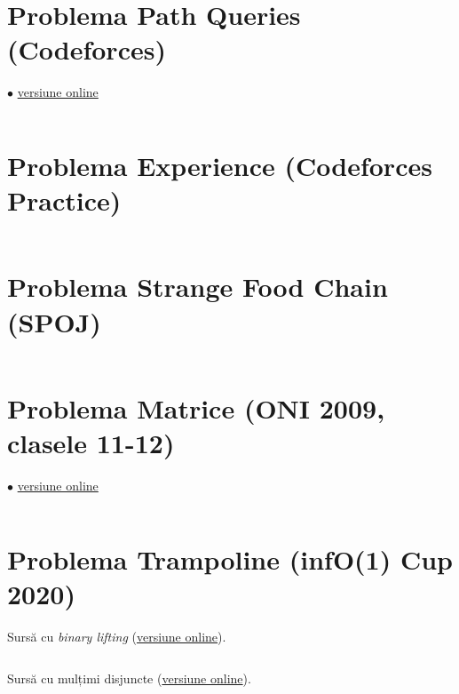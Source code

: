 \documentclass[../main.tex]{subfiles}
\begin{document}
\inputminted{cpp}{../src/other-ds/consecutive-letters.cpp}

\section{Problema Path Queries (Codeforces)}
\label{code:path-queries-2}
$\bullet$
\href{https://codeforces.com/contest/1213/submission/399150716}{versiune online}

\inputminted{cpp}{../src/other-ds/path-queries.cpp}

\section{Problema Experience (Codeforces Practice)}
\label{code:experience}

\inputminted{cpp}{../src/other-ds/experience.cpp}

\section{Problema Strange Food Chain (SPOJ)}
\label{code:strange-food-chain}

\inputminted{cpp}{../src/other-ds/strange-food-chain.cpp}

\section{Problema Matrice (ONI 2009, clasele 11-12)}
\label{code:matrice}
$\bullet$
\href{https://kilonova.ro/submissions/1213292}{versiune online}

\inputminted{cpp}{../src/other-ds/matrice.cpp}

\section{Problema Trampoline (infO(1) Cup 2020)}
\label{code:trampoline}

Sursă cu \textit{binary lifting} (\href{https://kilonova.ro/submissions/550709}{versiune online}).

\inputminted{cpp}{../src/other-ds/trampoline-binary-lifting.cpp}

Sursă cu mulțimi disjuncte (\href{https://kilonova.ro/submissions/544103}{versiune online}).

\inputminted{cpp}{../src/other-ds/trampoline-dsf.cpp}
\end{document}
